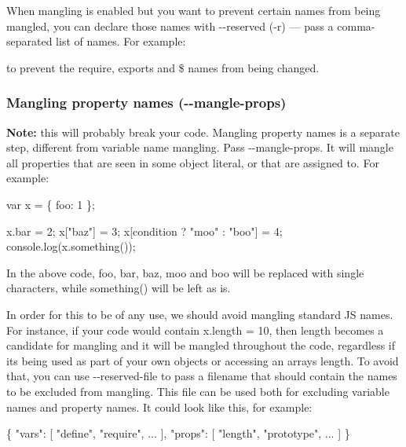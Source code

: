 When mangling is enabled but you want to prevent certain names from being mangled, you can declare those names with {\ttfamily -\/-\/reserved} ({\ttfamily -\/r}) — pass a comma-\/separated list of names. For example\+: 


to prevent the {\ttfamily require}, {\ttfamily exports} and {\ttfamily \$} names from being changed.

\subsubsection*{Mangling property names ({\ttfamily -\/-\/mangle-\/props})}

{\bfseries Note\+:} this will probably break your code. Mangling property names is a separate step, different from variable name mangling. Pass {\ttfamily -\/-\/mangle-\/props}. It will mangle all properties that are seen in some object literal, or that are assigned to. For example\+:


\begin{DoxyCode}
var x = \{
  foo: 1
\};

x.bar = 2;
x["baz"] = 3;
x[condition ? "moo" : "boo"] = 4;
console.log(x.something());
\end{DoxyCode}


In the above code, {\ttfamily foo}, {\ttfamily bar}, {\ttfamily baz}, {\ttfamily moo} and {\ttfamily boo} will be replaced with single characters, while {\ttfamily something()} will be left as is.

In order for this to be of any use, we should avoid mangling standard JS names. For instance, if your code would contain {\ttfamily x.\+length = 10}, then {\ttfamily length} becomes a candidate for mangling and it will be mangled throughout the code, regardless if it\textquotesingle{}s being used as part of your own objects or accessing an array\textquotesingle{}s length. To avoid that, you can use {\ttfamily -\/-\/reserved-\/file} to pass a filename that should contain the names to be excluded from mangling. This file can be used both for excluding variable names and property names. It could look like this, for example\+:


\begin{DoxyCode}
\{
  "vars": [ "define", "require", ... ],
  "props": [ "length", "prototype", ... ]
\}
\end{DoxyCode}


